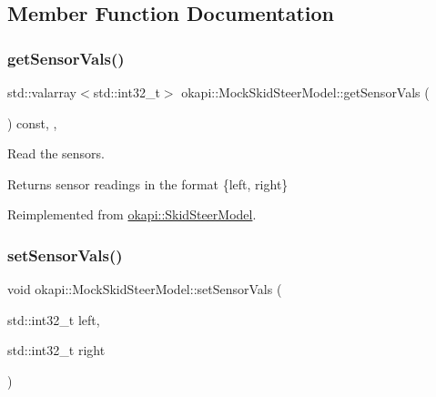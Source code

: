 \subsection{Member Function Documentation}
\mbox{\label{classokapi_1_1MockSkidSteerModel_a460cd78aeee4fb1c8eee0113de84075a}} 
\subsubsection{\texorpdfstring{getSensorVals()}{getSensorVals()}}
{\footnotesize\ttfamily std\+::valarray$<$std\+::int32\+\_\+t$>$ okapi\+::\+Mock\+Skid\+Steer\+Model\+::get\+Sensor\+Vals (\begin{DoxyParamCaption}{ }\end{DoxyParamCaption}) const\hspace{0.3cm}{\ttfamily [inline]}, {\ttfamily [override]}, {\ttfamily [virtual]}}



Read the sensors. 

\begin{DoxyReturn}{Returns}
sensor readings in the format \{left, right\} 
\end{DoxyReturn}


Reimplemented from \mbox{\hyperlink{classokapi_1_1SkidSteerModel_a850e4de7ab3a30a354ac39f30a1e8603}{okapi\+::\+Skid\+Steer\+Model}}.

\mbox{\label{classokapi_1_1MockSkidSteerModel_ab3790520e913c3d720f6cae0b99ff6e2}} 
\subsubsection{\texorpdfstring{setSensorVals()}{setSensorVals()}}
{\footnotesize\ttfamily void okapi\+::\+Mock\+Skid\+Steer\+Model\+::set\+Sensor\+Vals (\begin{DoxyParamCaption}\item[{std\+::int32\+\_\+t}]{left,  }\item[{std\+::int32\+\_\+t}]{right }\end{DoxyParamCaption})\hspace{0.3cm}{\ttfamily [inline]}}



